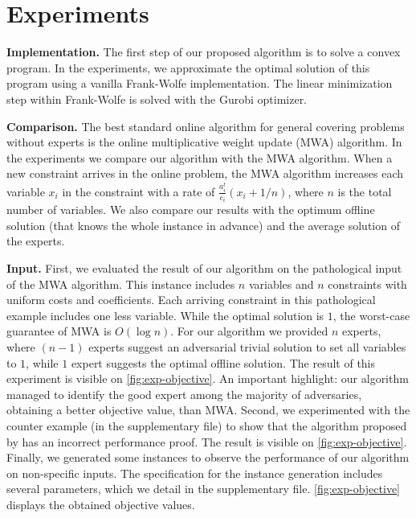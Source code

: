 
\section{Experiments}

\textbf{Implementation.} The first step of our proposed algorithm is to solve a convex program. In the experiments, we approximate the optimal solution of this program using a vanilla Frank-Wolfe implementation. The linear minimization step within Frank-Wolfe is solved with the Gurobi optimizer.

\textbf{Comparison.} The best standard online algorithm for general covering problems without experts is the online multiplicative weight update (MWA) algorithm. In the experiments we compare our algorithm with the MWA algorithm. When a new constraint arrives in the online problem, the MWA algorithm increases each variable $x_i$ in the constraint with a rate of $\frac{a^t_i}{c_i}(x_i + 1/n)$, where $n$ is the total number of variables. We also compare our results with the optimum offline solution (that knows the whole instance in advance) and the average solution of the experts.

\textbf{Input.} First, we evaluated the result of our algorithm on the pathological input of the MWA algorithm. This instance includes $n$ variables and $n$ constraints with uniform costs and coefficients. Each arriving constraint in this pathological example includes one less variable. While the optimal solution is $1$, the worst-case guarantee of MWA is $O(\log n)$. For our algorithm we provided $n$ experts, where $(n-1)$ experts suggest an adversarial trivial solution to set all variables to $1$, while $1$ expert suggests the optimal offline solution. The result of this experiment is visible on \cref{fig:exp-objective}. An important highlight: our algorithm managed to identify the good expert among the majority of adversaries, obtaining a better objective value, than MWA. Second, we experimented with the counter example (in the supplementary file) to show that the algorithm proposed by \cite{AnandGe22:Online-Algorithms} has an incorrect performance proof. The result is visible on \cref{fig:exp-objective}. Finally, we generated some instances to observe the performance of our algorithm on non-specific inputs.
The specification for the instance generation includes several parameters, which we detail in the supplementary file. %
\cref{fig:exp-objective} displays the obtained objective values.

